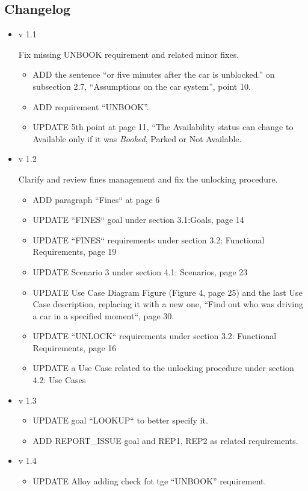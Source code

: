 \documentclass[11pt]{article} %
\begin{document}
\subsection{Changelog}
\begin{itemize}
	
	\item v 1.1

	Fix missing UNBOOK requirement and related minor fixes.
	\begin{itemize}
		\item ADD the sentence ``or five minutes after the car is unblocked.'' on subsection 2.7, ``Assumptions on the car system'', point 10.
		\item ADD requirement ``UNBOOK''.
		\item UPDATE 5th point at page 11, ``The Availability status can change to Available only if it was \textit{Booked}, Parked or Not Available.
	\end{itemize}
	
	\item v 1.2
	
	Clarify and review fines management and fix the unlocking procedure.
	\begin{itemize}
		\item ADD paragraph ``Fines`` at page 6
		\item UPDATE ``FINES`` goal under section 3.1:Goals, page 14
		\item UPDATE ``FINES`` requirements under section 3.2: Functional Requirements, page 19
		\item UPDATE Scenario 3 under section 4.1: Scenarios, page 23
		\item UPDATE Use Case Diagram Figure (Figure 4, page 25) and the last Use Case description, replacing it with a new one, ``Find out who was driving a car in a specified moment``, page 30.
		\item UPDATE ``UNLOCK`` requirements under section 3.2: Functional Requirements, page 16
		\item UPDATE a Use Case related to the unlocking procedure under section 4.2: Use Cases
	\end{itemize}

	\item v 1.3
	\begin{itemize}
		\item UPDATE goal ``LOOKUP`` to better specify it.
		\item ADD REPORT\_ISSUE goal and REP1, REP2 as related requirements.
	\end{itemize}	
	
	\item v 1.4
	\begin{itemize}
		\item UPDATE Alloy adding check fot tge ``UNBOOK'' requirement.
	\end{itemize}

\end{itemize}
\end{document}
